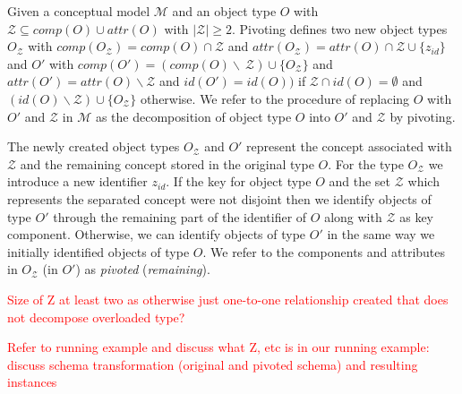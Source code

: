 \documentclass[sigconf]{acmart}
\begin{document}
\begin{definition}
\label{def:decomposition}
Given a conceptual model $\mathcal{M}$ and an object type $O$ with $\mathcal{Z} \subseteq comp(O) \cup attr(O)$ with $|\mathcal{Z}| \geq 2$. Pivoting defines two new object types $O_{\mathcal{Z}}$ with $comp(O_{\mathcal{Z}}) = comp(O) \cap \mathcal{Z}$ and $attr(O_{\mathcal{Z}}) = attr(O) \cap \mathcal{Z} \cup \{z_{id}\}$ and $O'$ with $comp(O') = (comp(O) \backslash \ \mathcal{Z}) \cup \{O_{\mathcal{Z}}\}$ and $attr(O') = attr(O) \backslash \mathcal{Z}$ and $id(O') = id(O))$ if $\mathcal{Z} \cap id(O) = \emptyset$ and $(id(O) \backslash \mathcal{Z}) \cup \{O_{\mathcal{Z}}\}$ otherwise. We refer to the procedure of replacing $O$ with $O'$ and $\mathcal{Z}$ in $\mathcal{M}$ as the decomposition of object type $O$ into $O'$ and $\mathcal{Z}$ by pivoting.
\end{definition}

The newly created object types $O_{\mathcal{Z}}$ and $O'$ represent the concept associated with $\mathcal{Z}$ and the remaining concept stored in the original type $O$. For the type $O_{\mathcal{Z}}$ we introduce a new identifier $z_{id}$. If the key for object type $O$ and the set $\mathcal{Z}$ which represents the separated concept were not disjoint then we identify objects of type $O'$ through the remaining part of the identifier of $O$ along with $\mathcal{Z}$ as key component. Otherwise, we can identify objects of type $O'$ in the same way we initially identified objects of type $O$. We refer to the components and attributes in $O_{\mathcal{Z}}$ (in $O'$) as \emph{pivoted} (\emph{remaining}). 



\textcolor{red}{Size of Z at least two as otherwise just one-to-one relationship created that does not decompose overloaded type?}

\textcolor{red}{Refer to running example and discuss what Z, etc is in our running example: discuss schema transformation (original and pivoted schema) and resulting instances}
\end{document}
